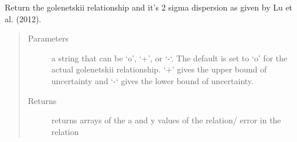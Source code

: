 \documentclass[letterpaper,10pt,english]{sphinxmanual}
\begin{document}

\begin{fulllineitems}
\label{\detokenize{read_process_files:read_process_files.golenetskii}}
Return the golenetskii relationship and it’s 2 sigma dispersion as given by Lu et al. (2012).
\begin{quote}\begin{description}
\item[{Parameters}] \leavevmode
{} \textendash{} a string that can be ‘o’, ‘+’, or ‘-‘. The default is set to ‘o’ for the actual golenetskii relationship.
‘+’ gives the upper bound of uncertainty and ‘-‘ gives the lower bound of uncertainty.

\item[{Returns}] \leavevmode
returns arrays of the a and y values of the relation/ error in the relation

\end{description}\end{quote}

\end{fulllineitems}

\end{document}
